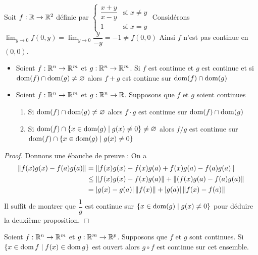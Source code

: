      \begin{exemple}
         Soit $f: \mathbb{R}\to\mathbb{R}^2$ définie par $\begin{cases}
             \dfrac{x+y}{x-y} &\text{si } x\ne y\\
             1 &\text{si } x=y
         \end{cases}$
         Considérons $\lim_{y \to 0} f(0,y) = \lim_{y\to 0}\dfrac{y}{-y} = -
         1\ne f(0,0)$
         Ainsi $f$ n'est pas continue en $(0,0)$.
     \end{exemple}
     \begin{proposition}
     \begin{itemize}
         \item Soient $f:\mathbb{R}^n\to\mathbb{R}^m$ et $g:\mathbb{R}^n\to\mathbb{R}^m$. Si $f$ est continue et $g$ est continue et si $\operatorname{dom}(f)\cap\operatorname{dom}(g)\ne\varnothing$ alors $f+g$ est continue sur $\operatorname{dom}(f)\cap\operatorname{dom}(g)$
        \item Soient $f:\mathbb{R}^n\to\mathbb{R}^m$ et $g:\mathbb{R}^n\to\mathbb{R}$. Supposons que $f$ et $g$ soient continues \begin{enumerate}
            \item Si $\operatorname{dom}(f)\cap\operatorname{dom}(g)\ne\varnothing$ alors $f\cdot g$ est continue sur $\operatorname{dom}(f)\cap\operatorname{dom}(g)$
            \item Si $\operatorname{dom}(f)\cap\{ x \in \operatorname{dom}(g)\mid g(x)\ne 0\}\ne\varnothing$ alors $f/ g$ est continue sur $\operatorname{dom}(f)\cap\{ x \in \operatorname{dom}(g)\mid g(x)\ne 0\}$
        \end{enumerate}
         \end{itemize}
     \end{proposition}
     \begin{proof}
     Donnons une ébauche de preuve : On a \begin{align}
         \left\| f(x)g(x)-f(a)g(a) \right\|&=\left\| f(x)g(x)-f(x)g(a)+f(x)g(a)-f(a)g(a) \right\|\\
         &\leq \left\| f(x)g(x)-f(x)g(a) \right\| + \left\| (f(x)g(a)-f(a)g(a) \right\|\\
         &=|g(x)-g(a)|\left\| f(x) \right\| + |g(a)|\left\| f(x)-f(a) \right\|
     \end{align}
     Il suffit de montrer que $\dfrac 1 g$ est continue sur $\{ x \in \operatorname{dom}(g)\mid g(x)\ne 0\}$ pour déduire la deuxième proposition.
     \end{proof}
     \begin{proposition}
        Soient $f:\mathbb{R}^n\to\mathbb{R}^m$ et $g:\mathbb{R}^m\to\mathbb{R}^p$. Supposons que $f$ et $g$ sont continues. Si $\{x\in\operatorname{dom} f\mid f(x)\in\operatorname{dom} g\}$ est ouvert alors $g \circ f$ est continue sur cet ensemble.
     \end{proposition}
